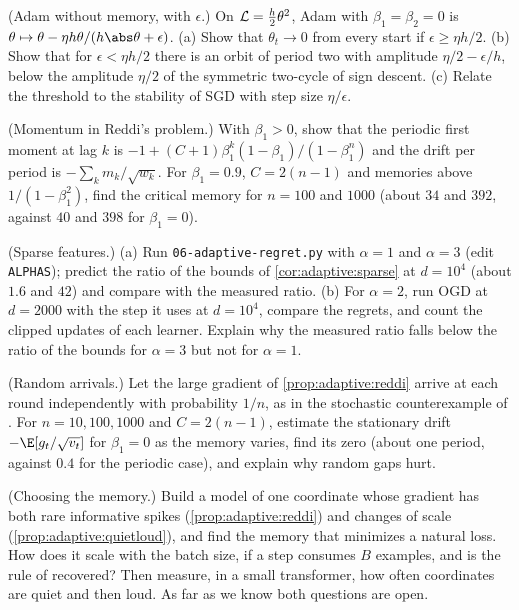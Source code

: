 \begin{refsection}
\begin{exercises}
\item \variation (Adam without memory, with $\epsilon$.) On $\mathcal{L}=\frac h2\theta^2$, Adam with $\beta_1=\beta_2=0$ is $\theta\mapsto\theta-\eta h\theta/(h\abs\theta+\epsilon)$. (a) Show that $\theta_t\to0$ from every start if $\epsilon\ge\eta h/2$. (b) Show that for $\epsilon<\eta h/2$ there is an orbit of period two with amplitude $\eta/2-\epsilon/h$, below the amplitude $\eta/2$ of the symmetric two-cycle of sign descent. (c) Relate the threshold to the stability of SGD with step size $\eta/\epsilon$.\label{ex:adaptive:eps}

\item \variation (Momentum in Reddi's problem.) With $\beta_1>0$, show that the periodic first moment at lag $k$ is $-1+(C+1)\beta_1^k(1-\beta_1)/(1-\beta_1^n)$ and the drift per period is $-\sum_km_k/\sqrt{w_k}$. For $\beta_1=0.9$, $C=2(n-1)$ and memories above $1/(1-\beta_1^2)$, find the critical memory for $n=100$ and $1000$ (about $34$ and $392$, against $40$ and $398$ for $\beta_1=0$).\label{ex:adaptive:momentum}

\item \simulation (Sparse features.) (a) Run \texttt{06-adaptive-regret.py} with $\alpha=1$ and $\alpha=3$ (edit \texttt{ALPHAS}); predict the ratio of the bounds of \cref{cor:adaptive:sparse} at $d=10^4$ (about $1.6$ and $42$) and compare with the measured ratio. (b) For $\alpha=2$, run OGD at $d=2000$ with the step it uses at $d=10^4$, compare the regrets, and count the clipped updates of each learner. Explain why the measured ratio falls below the ratio of the bounds for $\alpha=3$ but not for $\alpha=1$.\label{ex:adaptive:sparse}

\item \simulation (Random arrivals.) Let the large gradient of \cref{prop:adaptive:reddi} arrive at each round independently with probability $1/n$, as in the stochastic counterexample of \textcite{ReddiKaleKumar2018}. For $n=10,100,1000$ and $C=2(n-1)$, estimate the stationary drift $-\E[g_t/\sqrt{v_t}]$ for $\beta_1=0$ as the memory varies, find its zero (about one period, against $0.4$ for the periodic case), and explain why random gaps hurt.\label{ex:adaptive:random}

\item \research (Choosing the memory.) Build a model of one coordinate whose gradient has both rare informative spikes (\cref{prop:adaptive:reddi}) and changes of scale (\cref{prop:adaptive:quietloud}), and find the memory that minimizes a natural loss. How does it scale with the batch size, if a step consumes $B$ examples, and is the rule of \textcite{MarekEtAl2025} recovered? Then measure, in a small transformer, how often coordinates are quiet and then loud. As far as we know both questions are open.\label{ex:adaptive:research1}


\end{exercises}
\end{refsection}
